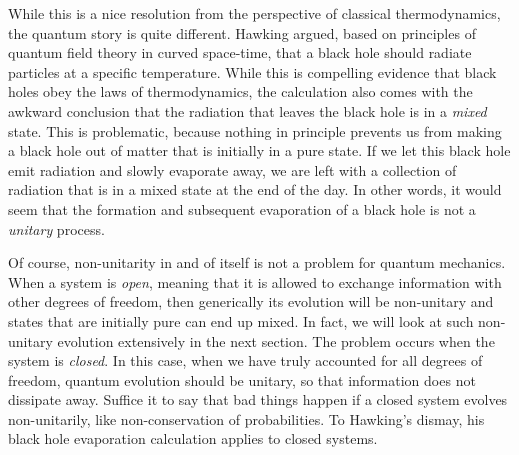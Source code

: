 \documentclass[a4paper,11pt]{article}
\begin{document}
While this is a nice resolution from the perspective of classical thermodynamics, the quantum story is quite different.
Hawking argued, based on principles of quantum field theory in curved space-time, that a black hole should radiate particles at a specific temperature.
While this is compelling evidence that black holes obey the laws of thermodynamics, the calculation also comes with the awkward conclusion that the radiation that leaves the black hole is in a \emph{mixed} state.
This is problematic, because nothing in principle prevents us from making a black hole out of matter that is initially in a pure state.
If we let this black hole emit radiation and slowly evaporate away, we are left with a collection of radiation that is in a mixed state at the end of the day.
In other words, it would seem that the formation and subsequent evaporation of a black hole is not a \emph{unitary} process.

Of course, non-unitarity in and of itself is not a problem for quantum mechanics.
When a system is \emph{open}, meaning that it is allowed to exchange information with other degrees of freedom, then generically its evolution will be non-unitary and states that are initially pure can end up mixed.
In fact, we will look at such non-unitary evolution extensively in the next section.
The problem occurs when the system is \emph{closed}.
In this case, when we have truly accounted for all degrees of freedom, quantum evolution should be unitary, so that information does not dissipate away.
Suffice it to say that bad things happen if a closed system evolves non-unitarily, like non-conservation of probabilities.
To Hawking's dismay, his black hole evaporation calculation applies to closed systems.
\end{document}
